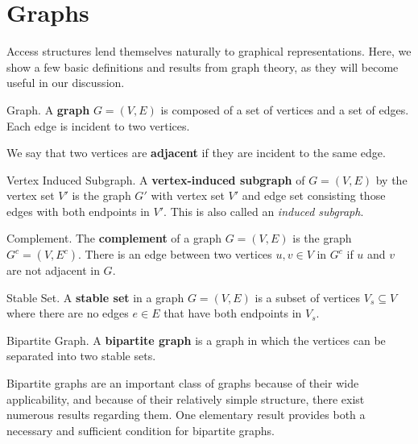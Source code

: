 \chapter{Graphs}
\label{ch:graphs}

Access structures lend themselves naturally to graphical representations. Here, we show a few basic definitions and results from graph theory, as they will become useful in our discussion.

\begin{definition}{Graph.}
    \label{defn:graph}
    A \textbf{graph} $G=(V,E)$ is composed of a set of vertices and a set of edges. Each edge is incident to two vertices.
\end{definition}

We say that two vertices are \textbf{adjacent} if they are incident to the same edge.

\begin{definition}{Vertex Induced Subgraph.}
    \label{defn:vert-induced-subgraph}
    A \textbf{vertex-induced subgraph} of $G=(V,E)$ by the vertex set $V'$ is the graph $G'$ with vertex set $V'$ and edge set consisting those edges with both endpoints in $V'$. This is also called an \textit{induced subgraph}.
\end{definition}

\begin{definition}{Complement.}
    \label{defn:graph-complement}
    The \textbf{complement} of a graph $G=(V,E)$ is the graph $G^c = (V,E^c)$. There is an edge between two vertices $u,v \in V$ in $G^c$ if $u$ and $v$ are not adjacent in $G$. 
\end{definition}

\begin{definition}{Stable Set.}
    \label{defn:stable-set}
    A \textbf{stable set} in a graph $G=(V,E)$ is a subset of vertices $V_s \subseteq  V$ where there are no edges $e \in E$ that have both endpoints in $V_s$.
\end{definition}

\begin{definition}{Bipartite Graph.}
    \label{defn:bipartite}
	A \textbf{bipartite graph} is a graph in which the vertices can be separated into two stable sets.
\end{definition}

Bipartite graphs are an important class of graphs because of their wide applicability, and because of their relatively simple structure, there exist numerous results regarding them. One elementary result provides both a necessary and sufficient condition for bipartite graphs.

